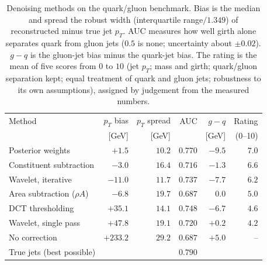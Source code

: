 \begin{table}[htbp]
  \centering
  \caption{Denoising methods on the quark/gluon benchmark. Bias is the median
    and spread the robust width (interquartile range$/1.349$) of reconstructed
    minus true jet $p_T$. AUC measures how well girth alone separates quark
    from gluon jets ($0.5$ is none; uncertainty about $\pm0.02$). $g-q$ is the
    gluon-jet bias minus the quark-jet bias. The rating is the mean of five
    scores from $0$ to $10$ (jet $p_T$; mass and girth; quark/gluon separation
    kept; equal treatment of quark and gluon jets; robustness to its own
    assumptions), assigned by judgement from the measured numbers.}
  \label{tab:denoise}
  \begin{tabular}{lrrrrr}
    \toprule
    Method & $p_T$ bias & $p_T$ spread & AUC & $g-q$ & Rating \\
           & [GeV]      & [GeV]        &     & [GeV] & (0--10) \\
    \midrule
    Posterior weights            & $+1.5$   & $10.2$ & $0.770$ & $-9.5$ & $7.0$ \\
    Constituent subtraction      & $-3.0$   & $16.4$ & $0.716$ & $-1.3$ & $6.6$ \\
    Wavelet, iterative           & $-11.0$  & $11.7$ & $0.737$ & $-7.7$ & $6.2$ \\
    Area subtraction ($\rho A$)  & $-6.8$   & $19.7$ & $0.687$ & $0.0$  & $5.0$ \\
    DCT thresholding             & $+35.1$  & $14.1$ & $0.748$ & $-6.7$ & $4.6$ \\
    Wavelet, single pass         & $+47.8$  & $19.1$ & $0.720$ & $+0.2$ & $4.2$ \\
    No correction                & $+233.2$ & $29.2$ & $0.687$ & $+5.0$ & --    \\
    \midrule
    True jets (best possible)    &          &        & $0.790$ &        &       \\
    \bottomrule
  \end{tabular}
\end{table}

